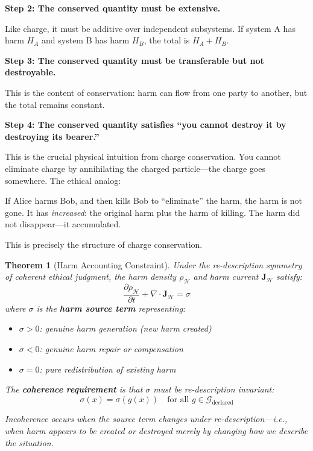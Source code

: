 \documentclass[12pt,letterpaper]{article}
\newtheorem{theorem}{Theorem}[section]
\theoremstyle{definition}
\theoremstyle{remark}
\newcommand{\harm}{\mathcal{H}}
\newcommand{\G}{\mathcal{G}}
\begin{document}
\textbf{Step 2: The conserved quantity must be extensive.}

Like charge, it must be additive over independent subsystems. If system A has harm $H_A$ and system B has harm $H_B$, the total is $H_A + H_B$.

\textbf{Step 3: The conserved quantity must be transferable but not destroyable.}

This is the content of conservation: harm can flow from one party to another, but the total remains constant.

\textbf{Step 4: The conserved quantity satisfies ``you cannot destroy it by destroying its bearer.''}

This is the crucial physical intuition from charge conservation. You cannot eliminate charge by annihilating the charged particle---the charge goes somewhere. The ethical analog:

\begin{center}
\end{center}

If Alice harms Bob, and then kills Bob to ``eliminate'' the harm, the harm is not gone. It has \textit{increased}: the original harm plus the harm of killing. The harm did not disappear---it accumulated.

This is precisely the structure of charge conservation.

\begin{theorem}[Harm Accounting Constraint]
Under the re-description symmetry of coherent ethical judgment, the harm density $\rho_\harm$ and harm current $\mathbf{J}_\harm$ satisfy:
\begin{equation}
\frac{\partial \rho_\harm}{\partial t} + \nabla \cdot \mathbf{J}_\harm = \sigma
\end{equation}
where $\sigma$ is the \textbf{harm source term} representing:
\begin{itemize}
    \item $\sigma > 0$: genuine harm generation (new harm created)
    \item $\sigma < 0$: genuine harm repair or compensation
    \item $\sigma = 0$: pure redistribution of existing harm
\end{itemize}

The \textbf{coherence requirement} is that $\sigma$ must be re-description invariant:
\begin{equation}
\sigma(x) = \sigma(g(x)) \quad \text{for all } g \in \G_{\text{declared}}
\end{equation}

Incoherence occurs when the source term changes under re-description---i.e., when harm appears to be created or destroyed merely by changing how we describe the situation.
\end{theorem}
\end{document}
